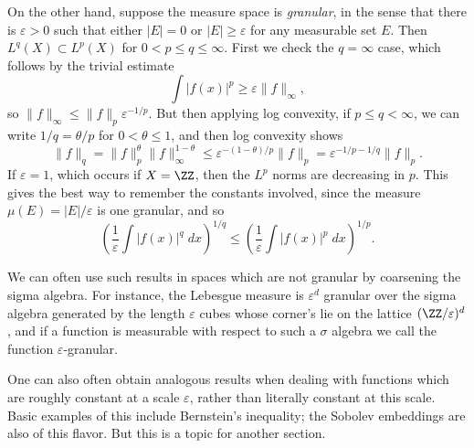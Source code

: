 \begin{example}
  On the other hand, suppose the measure space is {\it granular}, in the sense that there is $\varepsilon > 0$ such that either $|E| = 0$ or $|E| \geq \varepsilon$ for any measurable set $E$. Then $L^q(X) \subset L^p(X)$ for $0 < p \leq q \leq \infty$. First we check the $q = \infty$ case, which follows by the trivial estimate
  \[ \int |f(x)|^p \geq \varepsilon \| f \|_\infty, \]
  so $\| f \|_\infty \leq \| f \|_p \varepsilon^{-1/p}$. But then applying log convexity, if $p \leq q < \infty$, we can write $1/q = \theta/p$ for $0 < \theta \leq 1$, and then log convexity shows
  \[ \| f \|_q = \| f \|_p^\theta \| f \|_\infty^{1-\theta} \leq \varepsilon^{-(1 - \theta)/p} \| f \|_p = \varepsilon^{-1/p - 1/q} \| f \|_p. \]
  If $\varepsilon = 1$, which occurs if $X = \ZZ$, then the $L^p$ norms are decreasing in $p$. This gives the best way to remember the constants involved, since the measure $\mu(E) = |E|/\varepsilon$ is one granular, and so
  \[ \left( \frac{1}{\varepsilon} \int |f(x)|^q\; dx \right)^{1/q} \leq \left( \frac{1}{\varepsilon} \int |f(x)|^p\; dx \right)^{1/p}. \]
\end{example}



\begin{remark}
  We can often use such results in spaces which are not granular by coarsening the sigma algebra. For instance, the Lebesgue measure is $\varepsilon^d$ granular over the sigma algebra generated by the length $\varepsilon$ cubes whose corner's lie on the lattice $(\ZZ/\varepsilon)^d$, and if a function is measurable with respect to such a $\sigma$ algebra we call the function $\varepsilon$-granular.

  One can also often obtain analogous results when dealing with functions which are roughly constant at a scale $\varepsilon$, rather than literally constant at this scale. Basic examples of this include Bernstein's inequality; the Sobolev embeddings are also of this flavor. But this is a topic for another section.
\end{remark}

